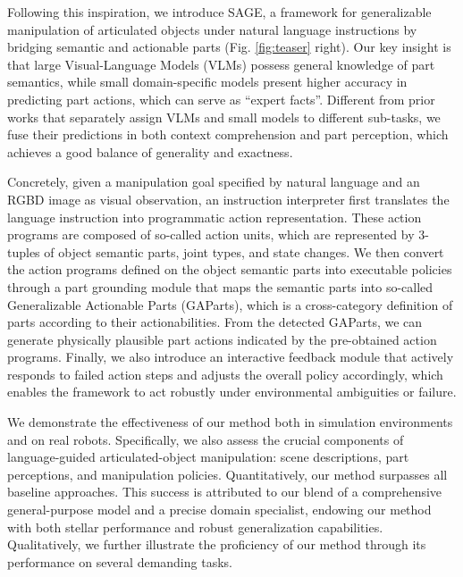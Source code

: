 Following this inspiration, we introduce SAGE, a framework for generalizable manipulation of articulated objects under natural language instructions by bridging semantic and actionable parts (Fig. \ref{fig:teaser} right).
%
Our key insight is that large Visual-Language Models (VLMs) possess general knowledge of part semantics, while small domain-specific models present higher accuracy in predicting part actions, which can serve as ``expert facts''.
%
Different from prior works that separately assign VLMs and small models to different sub-tasks\citep{huang2023voxposer}, we fuse their predictions in both context comprehension and part perception, which achieves a good balance of generality and exactness.

Concretely, given a manipulation goal specified by natural language and an RGBD image as visual observation, an instruction interpreter first translates the language instruction into programmatic action representation. These action programs are composed of so-called action units, which are represented by 3-tuples of object semantic parts, joint types, and state changes.
%
We then convert the action programs defined on the object semantic parts into executable policies through a part grounding module that maps the semantic parts into so-called Generalizable Actionable Parts (GAParts), which is a cross-category definition of parts according to their actionabilities.
%
From the detected GAParts, we can generate physically plausible part actions indicated by the pre-obtained action programs.
%
Finally, we also introduce an interactive feedback module that actively responds to failed action steps and adjusts the overall policy accordingly, which enables the framework to act robustly under environmental ambiguities or failure.

We demonstrate the effectiveness of our method both in simulation environments and on real robots. 
Specifically, we also assess the crucial components of language-guided articulated-object manipulation: scene descriptions, part perceptions, and manipulation policies. Quantitatively, our method surpasses all baseline approaches. This success is attributed to our blend of a comprehensive general-purpose model and a precise domain specialist, endowing our method with both stellar performance and robust generalization capabilities. Qualitatively, we further illustrate the proficiency of our method through its performance on several demanding tasks.

